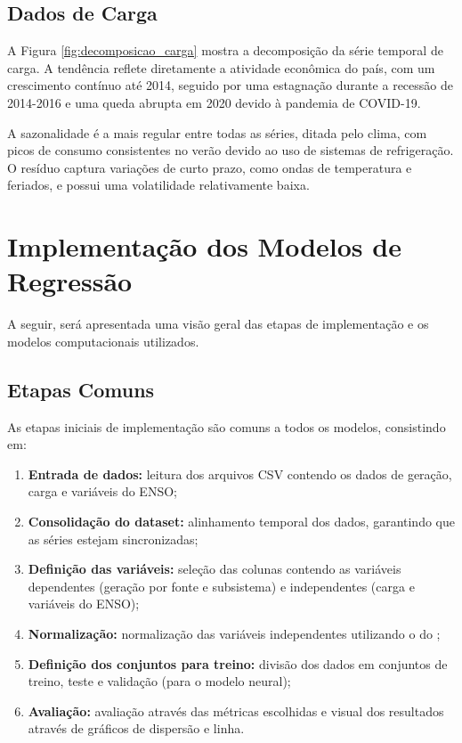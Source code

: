 \subsection{Dados de Carga} %
\begin{figure}[!ht]
  {}
  {}
\end{figure}
A Figura \ref{fig:decomposicao_carga} mostra a decomposição da série temporal de carga. A tendência
reflete diretamente a atividade econômica do país, com um crescimento contínuo até 2014, seguido por uma estagnação durante 
a recessão de 2014-2016 e uma queda abrupta em 2020 devido à pandemia de COVID-19. \cite{Magazzino2021}

A sazonalidade é a mais regular entre todas as séries, ditada pelo clima, com picos de consumo consistentes no verão devido 
ao uso de sistemas de refrigeração. O resíduo captura variações de curto prazo, como ondas de temperatura e feriados, e 
possui uma volatilidade relativamente baixa.


\section{Implementação dos Modelos de Regressão} %
A seguir, será apresentada uma visão geral das etapas de implementação e os modelos computacionais utilizados.

\subsection{Etapas Comuns} %
As etapas iniciais de implementação são comuns a todos os modelos, consistindo em: 
\begin{enumerate}
    \item \textbf{Entrada de dados:} leitura dos arquivos CSV contendo os dados de geração, carga e variáveis do ENSO;
    \item \textbf{Consolidação do dataset:} alinhamento temporal dos dados, garantindo que as séries estejam sincronizadas;
    \item \textbf{Definição das variáveis:} seleção das colunas contendo as variáveis dependentes (geração por fonte e subsistema) e 
independentes (carga e variáveis do ENSO);
    \item \textbf{Normalização:} normalização das variáveis independentes utilizando o  do ;
    \item \textbf{Definição dos conjuntos para treino:} divisão dos dados em conjuntos de treino, teste e validação (para o modelo neural);
    \item \textbf{Avaliação:} avaliação através das métricas escolhidas e visual dos resultados através de gráficos de dispersão e linha.
\end{enumerate}

